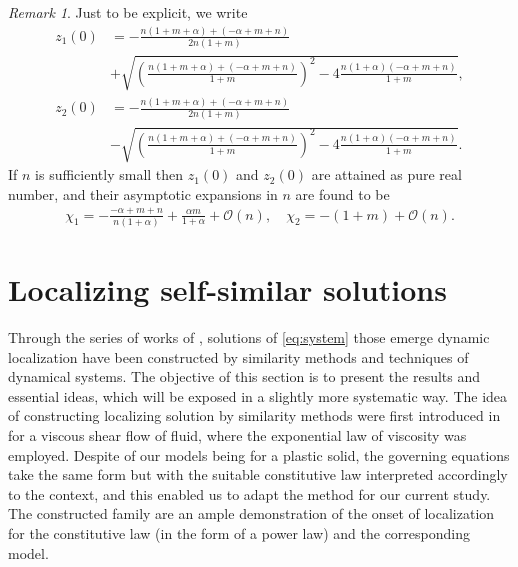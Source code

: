 \documentclass[a4paper,11pt]{article}
\theoremstyle{remark}
\newtheorem{remark}{Remark}[section]
\begin{document}
\begin{remark}
Just to be explicit, we write
\begin{align*}
 z_1(0) &= -\frac{n(1+m+\alpha) + (-\alpha+m+n)}{2n(1+m)} \\
 &+ \sqrt{\left(\frac{n(1+m+\alpha) + (-\alpha+m+n)}{1+m}\right)^2 -4 \frac{n(1+\alpha)(-\alpha+m+n)}{1+m}},\\
 z_2(0) &= -\frac{n(1+m+\alpha) + (-\alpha+m+n)}{2n(1+m)} \\
 &- \sqrt{\left(\frac{n(1+m+\alpha) + (-\alpha+m+n)}{1+m}\right)^2 -4 \frac{n(1+\alpha)(-\alpha+m+n)}{1+m}}.
\end{align*} 
 If $n$ is sufficiently small then $z_1(0)$ and $z_2(0)$ are attained as pure real number, and their asymptotic expansions in $n$ are found to be
\begin{align*}
 \chi_1 = -\frac{-\alpha+m+n}{n(1+\alpha)} + \frac{\alpha m}{1+\alpha} + \mathcal{O}(n), \quad
 \chi_2 = -(1+m)  + \mathcal{O}(n).
\end{align*} 
\end{remark}

\section{Localizing self-similar solutions}
Through the series of works of \cite{KOT14,KLT_16, KLT_HYP2016, KLT17}, solutions of \eqref{eq:system} those emerge dynamic localization have been constructed by similarity methods and techniques of dynamical systems. The objective of this section is to present the results and essential ideas, which will be exposed in a slightly more systematic way. The idea of constructing localizing solution by similarity methods were first introduced in \cite{KOT14} for a viscous shear flow of fluid, where the exponential law of viscosity was employed. Despite of our models being for a plastic solid, the governing equations take the same form but with the suitable constitutive law interpreted accordingly to the context, and this enabled us to adapt the method for our current study. The constructed family are an ample demonstration of the onset of localization for the constitutive law (in the form of a power law) and the corresponding model. 
\end{document}
